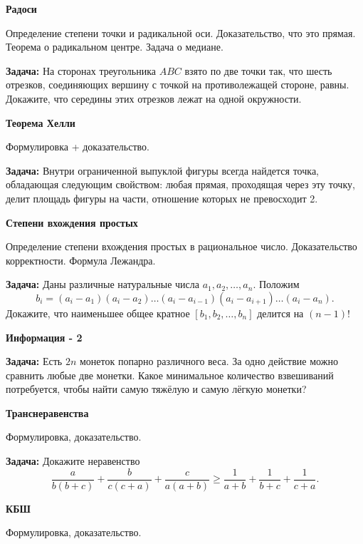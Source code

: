 \documentclass{article}
\begin{document}
\begin{enumerate_boxed}
        \item \textbf{Радоси}

        Определение степени точки и радикальной оси.
        Доказательство, что это прямая.
        Теорема о радикальном центре.
        Задача о медиане.

        \textbf{Задача:} На сторонах треугольника $ABC$ взято по две точки так, что шесть отрезков, соединяющих вершину с точкой на противолежащей стороне, равны.
        Докажите, что середины этих отрезков лежат на одной окружности.

        \item \textbf{Теорема Хелли}

        Формулировка + доказательство.

        \textbf{Задача:} Внутри ограниченной выпуклой фигуры всегда найдется точка, обладающая следующим свойством: любая прямая, проходящая через эту точку, делит площадь фигуры на части, отношение которых не превосходит 2.

        \item \textbf{Степени вхождения простых}

        Определение степени вхождения простых в рациональное число.
        Доказательство корректности.
        Формула Лежандра.

        \textbf{Задача:} Даны различные натуральные числа $a_1 , a_2 , \dotsc , a_n$.
        Положим
        \[b_i = (a_i - a_1)(a_i - a_2)\dotsc(a_i - a_{i-1})(a_i - a_{i+1})\dotsc(a_i - a_n).\]
        Докажите, что наименьшее общее кратное $[b_1 , b_2 , \dotsc , b_n ]$ делится на $(n - 1)!$

        \item \textbf{Информация - 2}

        \textbf{Задача:} Есть $2n$ монеток попарно различного веса.
        За одно действие можно сравнить любые две монетки.
        Какое минимальное количество взвешиваний потребуется, чтобы найти самую тяжёлую и самую лёгкую монетки?

        \item \textbf{Транснеравенства}

        Формулировка, доказательство.

        \textbf{Задача:} Докажите неравенство \[\frac{a}{b(b+c)} + \frac{b}{c(c+a)} + \frac{c}{a(a+b)} \geqslant \frac{1}{a+b} + \frac{1}{b+c} + \frac{1}{c+a}.\]

        \item \textbf{КБШ}

        Формулировка, доказательство.


\end{enumerate_boxed}
\end{document}
